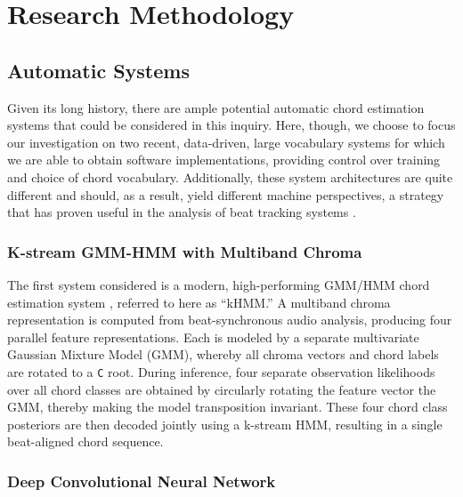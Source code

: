 \documentclass{article}
\begin{document}
\section{Research Methodology}
\label{sec:method}

\subsection{Automatic Systems}
\label{subsec:systems}

Given its long history, there are ample potential automatic chord estimation systems that could be considered in this inquiry.
Here, though, we choose to focus our investigation on two recent, data-driven, large vocabulary systems for which we are able to obtain software implementations, providing control over training and choice of chord vocabulary.
Additionally, these system architectures are quite different and should, as a result, yield different machine perspectives, a strategy that has proven useful in the analysis of beat tracking systems \cite{Zapata2012Assigning}.


\subsubsection{K-stream GMM-HMM with Multiband Chroma}
\label{subsubsec:kHMM}

The first system considered is a modern, high-performing GMM/HMM chord estimation system \cite{Cho2014Improved}, referred to here as ``kHMM.''
A multiband chroma representation is computed from beat-synchronous audio analysis, producing four parallel feature representations.
Each is modeled by a separate multivariate Gaussian Mixture Model (GMM), whereby all chroma vectors and chord labels are rotated to a \texttt{C} root.
During inference, four separate observation likelihoods over all chord classes are obtained by circularly rotating the feature vector the GMM, thereby making the model transposition invariant.
These four chord class posteriors are then decoded jointly using a k-stream HMM, resulting in a single beat-aligned chord sequence.


\subsubsection{Deep Convolutional Neural Network}
\label{subsubsec:DNN}
\end{document}

